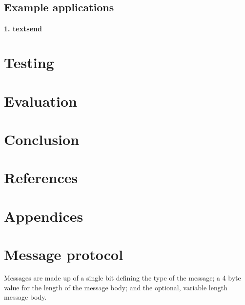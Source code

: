 \documentclass{article}
\begin{document}
\subsection{Example applications}

\paragraph{1. textsend}

\section{Testing}

\section{Evaluation}

\section{Conclusion}

\section{References}






\section{Appendices}
\appendix
\section{Message protocol}

Messages are made up of a single bit defining the type of the message; a 4 byte value for the length of the message body; and the optional, variable length message body.
\end{document}
